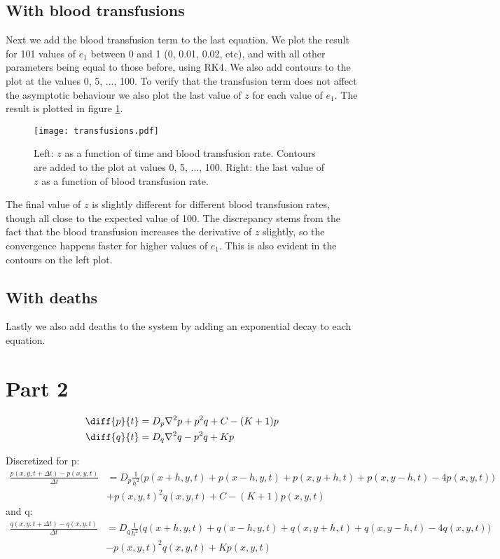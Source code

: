 \documentclass[a4paper,10pt]{article}
\begin{document}
	\subsection*{With blood transfusions}
	Next we add the blood transfusion term to the last equation. We plot the result for 101 values of $ e_1 $ between 0 and 1 (0, 0.01, 0.02, etc), and with all other parameters being equal to those before, using RK4. We also add contours to the plot at the values 0, 5, ..., 100. To verify that the transfusion term does not affect the asymptotic behaviour we also plot the last value of $ z $ for each value of $ e_1 $. The result is plotted in figure \ref{fig:transfusions}. 
	\begin{figure}[H]
		\centering
		\texttt{[image: transfusions.pdf]}
		\caption{Left: $ z $ as a function of time and blood transfusion rate. Contours are added to the plot at values 0, 5, ..., 100. Right: the last value of $ z $ as a function of blood transfusion rate.}
		\label{fig:transfusions}
	\end{figure}
	The final value of $ z $ is slightly different for different blood transfusion rates, though all close to the expected value of 100. The discrepancy stems from the fact that the blood transfusion increases the derivative of $ z $ slightly, so the convergence happens faster for higher values of $ e_1 $. This is also evident in the contours on the left plot.
	
	\subsection*{With deaths}
	Lastly we also add deaths to the system by adding an exponential decay to each equation.
	
	\newpage
	\section*{Part 2}
	\begin{align}
		\diff{p}{t} &= D_p \nabla^2 p + p^2q+C-(K+1)p \\
		\diff{q}{t} &= D_q \nabla^2 q - p^2q+Kp
	\end{align}
	
	Discretized for p:
	\begin{align*}
		\frac{p(x, y, t+\Delta t) - p(x,y,t)}{\Delta t} &= D_p \frac{1}{h^2}\Big(p(x+h, y, t) + p(x-h, y, t) + p(x, y+h, t) + p(x, y-h, t) - 4p(x, y, t)\Big) \\
		&+ p(x,y,t)^2q(x,y,t) + C - (K+1) p(x,y,t)
	\end{align*}
	and q:
	\begin{align*}
		\frac{q(x, y, t+\Delta t) - q(x,y,t)}{\Delta t} &= D_q \frac{1}{h^2}\Big(q(x+h, y, t) +q(x-h, y, t) + q(x, y+h, t) + q(x, y-h, t) - 4q(x, y, t)\Big) \\
		&- p(x,y,t)^2q(x,y,t) +K p(x,y,t)
	\end{align*}
	
\end{document}
